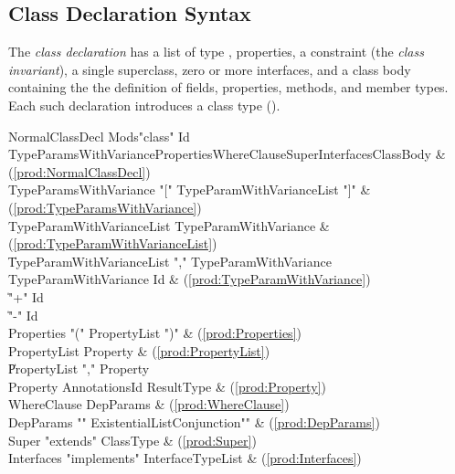  
 
\subsection{Class Declaration Syntax}

The {\em class declaration} has a list of type \params, properties, a
constraint (the {\em class invariant}), a single superclass, zero or more
interfaces, and a class body containing the the definition of fields,
properties, methods, and member types. Each such declaration introduces a
class type ().

\begin{bbgrammar}
 NormalClassDecl    \: Mods\opt \xcd"class" Id TypeParamsWithVariance\opt Properties\opt WhereClause\opt Super\opt Interfaces\opt ClassBody & (\ref{prod:NormalClassDecl})\\%
 TypeParamsWithVariance    \: \xcd"[" TypeParamWithVarianceList \xcd"]" & (\ref{prod:TypeParamsWithVariance})\\%
 TypeParamWithVarianceList    \: TypeParamWithVariance & (\ref{prod:TypeParamWithVarianceList})\\%
    \| TypeParamWithVarianceList \xcd"," TypeParamWithVariance\\
 TypeParamWithVariance    \: Id & (\ref{prod:TypeParamWithVariance})\\%
    \| \xcd"+" Id\\
    \| \xcd"-" Id\\
 Properties    \: \xcd"(" PropertyList \xcd")" & (\ref{prod:Properties})\\%
 PropertyList    \: Property & (\ref{prod:PropertyList})\\%
    \| PropertyList \xcd"," Property\\
 Property    \: Annotations\opt Id ResultType & (\ref{prod:Property})\\%
 WhereClause    \: DepParams & (\ref{prod:WhereClause})\\%
 DepParams    \: \xcd"{" ExistentialList\opt Conjunction\opt \xcd"}" & (\ref{prod:DepParams})\\%
 Super    \: \xcd"extends" ClassType & (\ref{prod:Super})\\%
 Interfaces    \: \xcd"implements" InterfaceTypeList & (\ref{prod:Interfaces})\\%

\end{bbgrammar}
